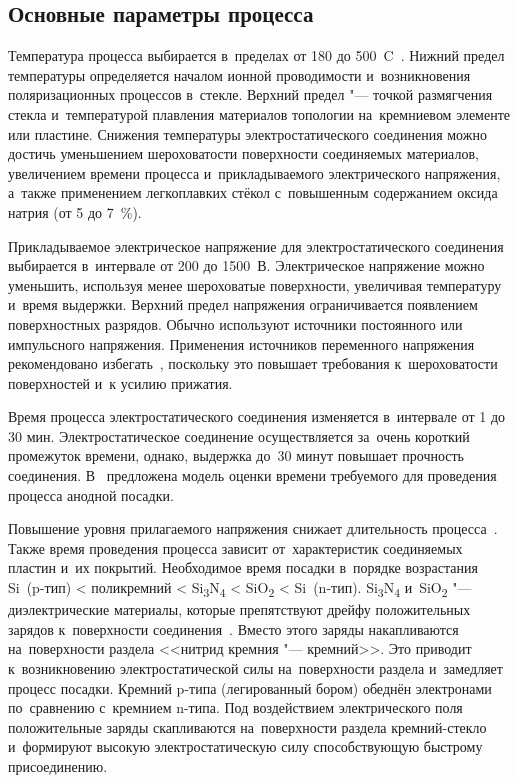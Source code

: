 \subsection{Основные параметры процесса}
Температура процесса выбирается в~пределах от 180 до 500~{\textdegree}C~\cites[484]{lit_madou2002fundamentals}.
Нижний предел температуры определяется началом ионной проводимости
и~возникновения поляризационных процессов в~стекле.
Верхний предел "--- точкой размягчения стекла
и~температурой плавления материалов топологии на~кремниевом элементе или пластине.
Снижения температуры электростатического соединения можно достичь уменьшением шероховатости поверхности соединяемых материалов, увеличением времени процесса и~прикладываемого электрического напряжения,
а~также применением легкоплавких стёкол с~повышенным содержанием оксида натрия (от 5 до 7~\%).

Прикладываемое электрическое напряжение для электростатического соединения выбирается в~интервале от 200 до 1500~В. Электрическое напряжение можно уменьшить, используя менее шероховатые поверхности, увеличивая температуру и~время выдержки. Верхний предел напряжения ограничивается появлением поверхностных разрядов. Обычно используют источники постоянного или импульсного напряжения. Применения источников переменного напряжения рекомендовано избегать~\cite{Anthony_AB_of_imperfect_surfaces}, поскольку это повышает требования к~шероховатости поверхностей и~к усилию прижатия.

Время процесса электростатического соединения изменяется в~интервале от 1 до 30 мин. Электростатическое соединение осуществляется за~очень короткий промежуток времени, однако, выдержка до~30 минут
повышает прочность соединения.
В~\cite{Rongyan2006Investigation_bond_time} предложена модель оценки
времени требуемого для проведения процесса анодной посадки.

Повышение уровня прилагаемого напряжения снижает длительность процесса~\cite{Lee_Detailed_characterization}. Также время проведения процесса зависит от~характеристик соединяемых пластин и~их покрытий. Необходимое время посадки в~порядке возрастания Si~(p\nb-тип) {\textless} поликремний {\textless} Si\textsubscript{3}N\textsubscript{4} {\textless} SiO\textsubscript{2} {\textless} Si~(n\nb-тип). Si\textsubscript{3}N\textsubscript{4} и~SiO\textsubscript{2} "--- диэлектрические материалы, которые препятствуют дрейфу положительных зарядов к~поверхности соединения~\cite{Lee_Detailed_characterization}.
Вместо этого заряды накапливаются на~поверхности раздела <<нитрид кремния "--- кремний>>.
Это приводит к~возникновению электростатической силы на~поверхности раздела и~замедляет процесс посадки. Кремний p\nb-типа (легированный бором) обеднён электронами по~сравнению с~кремнием n\nb-типа.
Под воздействием электрического поля положительные заряды скапливаются на~поверхности раздела кремний-стекло и~формируют высокую электростатическую силу способствующую быстрому присоединению.

